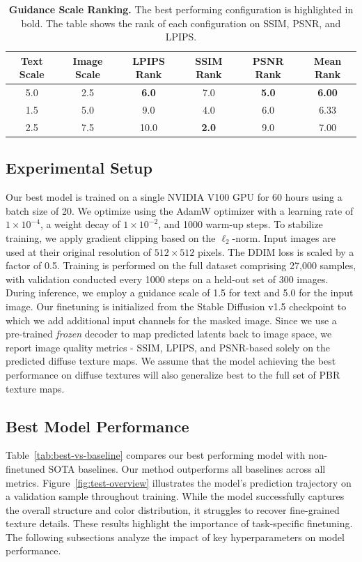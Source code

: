 \documentclass[11pt,twocolumn]{article}
\begin{document}
\vspace{1.5em}

\begin{table}[t]
  \centering
  \begin{tabular}{cc|cccc}
    \toprule
    \textbf{Text Scale} & \textbf{Image Scale} & \textbf{LPIPS Rank} & \textbf{SSIM Rank} & \textbf{PSNR Rank}  & \textbf{Mean Rank} \\
    \midrule
    5.0 & 2.5 & \textbf{6.0} & 7.0 & \textbf{5.0}  & \textbf{6.00} \\
    1.5 & 5.0 & 9.0 & 4.0 & 6.0 & 6.33 \\
    2.5 & 7.5 & 10.0 & \textbf{2.0} & 9.0 & 7.00 \\
    \bottomrule
  \end{tabular}
  \caption{\textbf{Guidance Scale Ranking.} 
  The best performing configuration is highlighted in bold. 
  The table shows the rank of each configuration on SSIM, PSNR, and LPIPS.}
  \label{tab:guidance-ranking}
\end{table}

\vspace{-2.0em}
\subsection{Experimental Setup}
Our best model is trained on a single NVIDIA V100 GPU for 60 hours using a batch size of 20. 
We optimize using the AdamW optimizer with a learning rate of \(1 \times 10^{-4}\), 
a weight decay of \(1 \times 10^{-2}\), and 1000 warm-up steps. 
To stabilize training, we apply gradient clipping based on the \(\ell_2\)-norm. 
Input images are used at their original resolution of \(512 \times 512\) pixels. 
The DDIM loss is scaled by a factor of 0.5. Training is performed on the full dataset comprising 27{,}000 samples, 
with validation conducted every 1000 steps on a held-out set of 300 images. 
During inference, we employ a guidance scale of 1.5 for text and 5.0 for the input image. 
Our finetuning is initialized from the Stable Diffusion v1.5 checkpoint \cite{sd} to which we add additional input channels
for the masked image. Since we use a pre-trained \textit{frozen} decoder to map predicted latents 
back to image space, we report image quality metrics - SSIM, LPIPS, and PSNR-based 
solely on the predicted diffuse texture maps. We assume that the model achieving the 
best performance on diffuse textures will also generalize best to the full set of PBR texture maps.

\subsection{Best Model Performance}
Table~\ref{tab:best-vs-baseline} compares our best performing model with non-finetuned SOTA baselines. 
Our method outperforms all baselines across all metrics. Figure~\ref{fig:test-overview} illustrates the model's 
prediction trajectory on a validation sample throughout training. While the model successfully captures the overall 
structure and color distribution, it struggles to recover fine-grained texture details. 
These results highlight the importance of task-specific finetuning. The following subsections analyze the impact of 
key hyperparameters on model performance.
\end{document}
